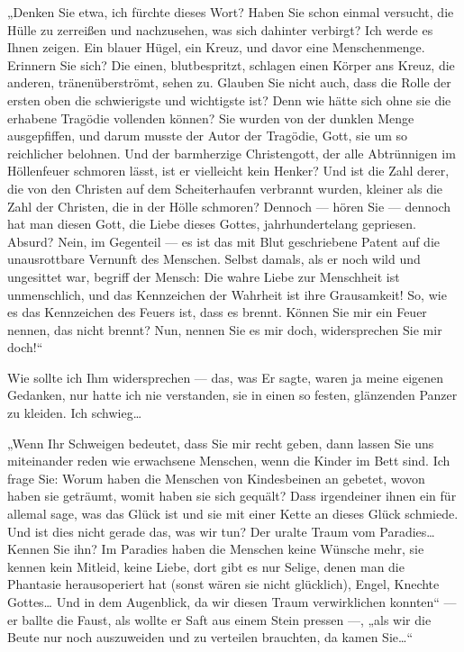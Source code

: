 „Denken Sie etwa, ich fürchte dieses Wort? Haben Sie schon einmal
versucht, die Hülle zu zerreißen und nachzusehen, was sich dahinter
verbirgt? Ich werde es Ihnen zeigen. Ein blauer Hügel, ein Kreuz,
und davor eine Menschenmenge. Erinnern Sie sich? Die einen,
blutbespritzt, schlagen einen Körper ans Kreuz, die anderen,
tränenüberströmt, sehen zu. Glauben Sie nicht auch, dass die Rolle
der ersten oben die schwierigste und wichtigste ist? Denn wie hätte
sich ohne sie die erhabene Tragödie vollenden können? Sie wurden
von der dunklen Menge ausgepfiffen, und darum musste der Autor der
Tragödie, Gott, sie um so reichlicher belohnen. Und der barmherzige
Christengott, der alle Abtrünnigen im Höllenfeuer schmoren lässt,
ist er vielleicht kein Henker? Und ist die Zahl derer, die von den
Christen auf dem Scheiterhaufen verbrannt wurden, kleiner als die
Zahl der Christen, die in der Hölle schmoren? Dennoch — hören Sie —
dennoch hat man diesen Gott, die Liebe dieses Gottes,
jahrhundertelang gepriesen. Absurd? Nein, im Gegenteil — es ist das
mit Blut geschriebene Patent auf die unausrottbare Vernunft des
Menschen. Selbst damals, als er noch wild und ungesittet war,
begriff der Mensch: Die wahre Liebe zur Menschheit ist
unmenschlich, und das Kennzeichen der Wahrheit ist ihre
Grausamkeit! So, wie es das Kennzeichen des Feuers ist, dass es
brennt. Können Sie mir ein Feuer nennen, das nicht brennt? Nun,
nennen Sie es mir doch, widersprechen Sie mir doch!“

Wie sollte ich
Ihm widersprechen — das, was Er sagte, waren ja meine eigenen
Gedanken, nur hatte ich nie verstanden, sie in einen so festen,
glänzenden Panzer zu kleiden. Ich schwieg\ldots{}

„Wenn Ihr Schweigen bedeutet, dass Sie mir recht geben, dann lassen
Sie uns miteinander reden wie erwachsene Menschen, wenn die Kinder
im Bett sind. Ich frage Sie: Worum haben die Menschen von
Kindesbeinen an gebetet, wovon haben sie geträumt, womit haben sie
sich gequält? Dass irgendeiner ihnen ein für allemal sage, was das
Glück ist und sie mit einer Kette an dieses Glück schmiede. Und ist
dies nicht gerade das, was wir
tun? Der uralte Traum vom Paradies\ldots{} Kennen Sie ihn? Im Paradies
haben die Menschen keine Wünsche mehr, sie kennen kein Mitleid,
keine Liebe, dort gibt es nur Selige, denen man die Phantasie
herausoperiert hat (sonst wären sie nicht glücklich), Engel,
Knechte Gottes\ldots{} Und in dem Augenblick, da wir diesen Traum
verwirklichen konnten“ — er ballte die Faust, als wollte er Saft
aus einem Stein pressen —, „als wir die Beute nur noch auszuweiden
und zu verteilen brauchten, da kamen Sie\ldots{}“


